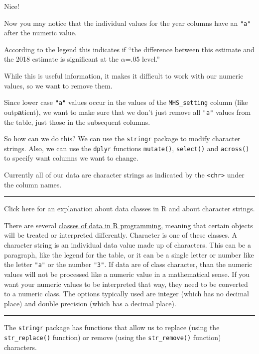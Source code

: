 \documentclass[
]{article}
\begin{document}
Nice!

Now you may notice that the individual values for the year columns have
an \texttt{"a"} after the numeric value.

According to the legend this indicates if ``the difference between this
estimate and the 2018 estimate is significant at the \(\alpha\)=.05
level.''

While this is useful information, it makes it difficult to work with our
numeric values, so we want to remove them.

Since lower case \texttt{"a"} values occur in the values of the
\texttt{MHS\_setting} column (like outp\textbf{a}tient), we want to make
sure that we don't just remove all \texttt{"a"} values from the table,
just those in the subsequent columns.

So how can we do this? We can use the \texttt{stringr} package to modify
character strings. Also, we can use the \texttt{dplyr} functions
\texttt{mutate()}, \texttt{select()} and \texttt{across()} to specify
want columns we want to change.

Currently all of our data are character strings as indicated by the
\texttt{\textless{}chr\textgreater{}} under the column names.

\begin{center}\rule{0.5\linewidth}{0.5pt}\end{center}

Click here for an explanation about data classes in R and about
character strings.

There are several
\href{https://en.wikipedia.org/wiki/R_(programming_language)}{classes of
data in R programming}, meaning that certain objects will be treated or
interpreted differently. Character is one of these classes. A character
string is an individual data value made up of characters. This can be a
paragraph, like the legend for the table, or it can be a single letter
or number like the letter \texttt{"a"} or the number \texttt{"3"}. If
data are of class character, than the numeric values will not be
processed like a numeric value in a mathematical sense. If you want your
numeric values to be interpreted that way, they need to be converted to
a numeric class. The options typically used are integer (which has no
decimal place) and double precision (which has a decimal place).

\begin{center}\rule{0.5\linewidth}{0.5pt}\end{center}

The \texttt{stringr} package has functions that allow us to replace
(using the \texttt{str\_replace()} function) or remove (using the
\texttt{str\_remove()} function) characters.
\end{document}
